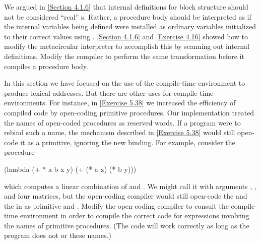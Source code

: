 \begin{exercise}
	\label{Exercise 5.43}
	We argued in \cref{Section 4.1.6} that internal definitions for block structure should not be considered “real” s.
	Rather, a procedure body should be interpreted as if the internal variables being defined were installed as ordinary  variables initialized to their correct values using .
	\cref{Section 4.1.6} and \cref{Exercise 4.16} showed how to modify the metacircular interpreter to accomplish this by scanning out internal definitions.
	Modify the compiler to perform the same transformation before it compiles a procedure body.
\end{exercise}



\begin{exercise}
	\label{Exercise 5.44}
	In this section we have focused on the use of the compile-time environment to produce lexical addresses.
	But there are other uses for compile-time environments.
	For instance, in \cref{Exercise 5.38} we increased the efficiency of compiled code by open-coding primitive procedures.
	Our implementation treated the names of open-coded procedures as reserved words.
	If a program were to rebind such a name, the mechanism described in \cref{Exercise 5.38} would still open-code it as a primitive, ignoring the new binding.
	For example, consider the procedure
	\begin{scheme}
	  (lambda (+ * a b x y)
	    (+ (* a x) (* b y)))
	\end{scheme}
	which computes a linear combination of  and .
	We might call it with arguments , , and four matrices, but the open-coding compiler would still open-code the \code{+} and the \code{*} in  as primitive \code{+} and \code{*}.
	Modify the open-coding compiler to consult the compile-time environment in order to compile the correct code for expressions involving the names of primitive procedures.
	(The code will work correctly as long as the program does not  or  these names.)
\end{exercise}
